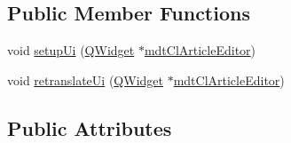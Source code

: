 \subsection*{Public Member Functions}
\begin{DoxyCompactItemize}
\item 
void \hyperlink{class_ui__mdt_cl_article_editor_a3540c1f02ce174a2d444c21e48dce8ae}{setup\-Ui} (\hyperlink{class_q_widget}{Q\-Widget} $\ast$\hyperlink{classmdt_cl_article_editor}{mdt\-Cl\-Article\-Editor})
\item 
void \hyperlink{class_ui__mdt_cl_article_editor_a3283de2f5a10155f37a2fb061d8bf6ba}{retranslate\-Ui} (\hyperlink{class_q_widget}{Q\-Widget} $\ast$\hyperlink{classmdt_cl_article_editor}{mdt\-Cl\-Article\-Editor})
\end{DoxyCompactItemize}
\subsection*{Public Attributes}
